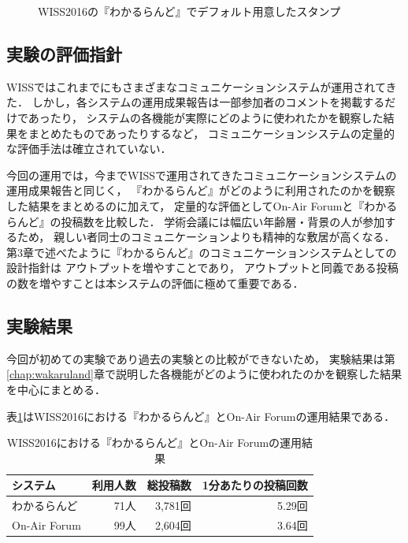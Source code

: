 \begin{figure}[H]
\centering
{}
\caption{WISS2016の『わかるらんど』でデフォルト用意したスタンプ}
\label{wiss2016stamp}
\end{figure}


\subsection{実験の評価指針}
WISSではこれまでにもさまざまなコミュニケーションシステムが運用されてきた．
しかし，各システムの運用成果報告は一部参加者のコメントを掲載するだけであったり，
システムの各機能が実際にどのように使われたかを観察した結果をまとめたものであったりするなど，
コミュニケーションシステムの定量的な評価手法は確立されていない\cite{nishida2006}\cite{nishida2011}．

今回の運用では，今までWISSで運用されてきたコミュニケーションシステムの運用成果報告と同じく，
『わかるらんど』がどのように利用されたのかを観察した結果をまとめるのに加えて，
定量的な評価としてOn-Air Forumと『わかるらんど』の投稿数を比較した．
学術会議には幅広い年齢層・背景の人が参加するため，
親しい者同士のコミュニケーションよりも精神的な敷居が高くなる．
第3章で述べたように『わかるらんど』のコミュニケーションシステムとしての設計指針は
アウトプットを増やすことであり，
アウトプットと同義である投稿の数を増やすことは本システムの評価に極めて重要である．

\subsection{実験結果}
今回が初めての実験であり過去の実験との比較ができないため，
実験結果は第\ref{chap:wakaruland}章で説明した各機能がどのように使われたのかを観察した結果を中心にまとめる．

表\ref{tb:wiss2016experiment}はWISS2016における『わかるらんど』とOn-Air Forumの運用結果である．

\begin{table}[H]
  \begin{center}
    \caption{WISS2016における『わかるらんど』とOn-Air Forumの運用結果}
    \label{tb:wiss2016experiment}
    \begin{tabular}{|l||r|r|r|} \hline
      システム & 利用人数 & 総投稿数 & 1分あたりの投稿回数 \\ \hline \hline
      わかるらんど & 71人 & 3,781回 & 5.29回 \\ \hline
      On-Air Forum & 99人 & 2,604回 & 3.64回 \\ \hline
    \end{tabular}
  \end{center}
\end{table}

